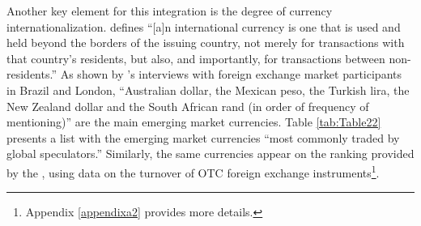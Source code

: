 \documentclass[a4paper, twoside]{templates/ociamthesis}
\begin{document}
Another key element for this integration is the degree of currency internationalization. \textcite[ 9]{kenen2011} defines ``{[}a{]}n international currency is one that is used and held beyond the borders of the issuing country, not merely for transactions with that country's residents, but also, and importantly, for transactions between non-residents.'' As shown by \textcite[ 13]{kaltenbrunner2018}'s interviews with foreign exchange market participants in Brazil and London, ``Australian dollar, the Mexican peso, the Turkish lira, the New Zealand dollar and the South African rand (in order of frequency of mentioning)'' are the main emerging market currencies. Table \ref{tab:Table22} presents a list with the emerging market currencies ``most commonly traded by global speculators.'' \autocite[ 42]{donnelly2019} Similarly, the same currencies appear on the ranking provided by the \textcite{bankforinternationalsettlements2021b}, using data on the turnover of OTC foreign exchange instruments\footnote{Appendix \ref{appendixa2} provides more details.}.
\end{document}
